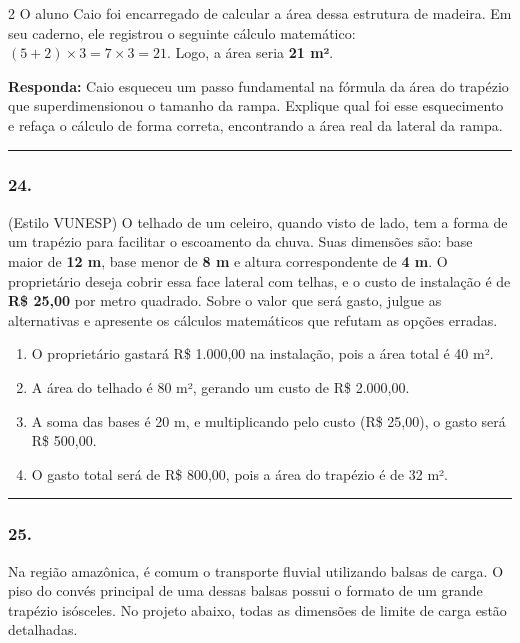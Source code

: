 \documentclass[twoside, 10pt, a4paper]{article}
\newlength{\espacoPreQuestao}\setlength{\espacoPreQuestao}{0.1cm}
\newlength{\espacoQuestao}\setlength{\espacoQuestao}{0.2cm}
\newlength{\espacoAlt}\setlength{\espacoAlt}{0.2cm}
\begin{document}
\begin{multicols*}{2}
O aluno Caio foi encarregado de calcular a área dessa estrutura de madeira. Em seu caderno, ele registrou o seguinte cálculo matemático: $ (5 + 2) \times 3 = 7 \times 3 = 21 $. Logo, a área seria \textbf{21 m²}.

\begin{boxresponda}
\textbf{Responda:} Caio esqueceu um passo fundamental na fórmula da área do trapézio que superdimensionou o tamanho da rampa. Explique qual foi esse esquecimento e refaça o cálculo de forma correta, encontrando a área real da lateral da rampa.
\end{boxresponda}
\par\vspace{\espacoQuestao}

\noindent\textcolor{CorLinha}{\rule{\linewidth}{0.5pt}} 
\par\vspace{\espacoPreQuestao}
\subsubsection*{24.} (Estilo VUNESP) O telhado de um celeiro, quando visto de lado, tem a forma de um trapézio para facilitar o escoamento da chuva. Suas dimensões são: base maior de \textbf{12 m}, base menor de \textbf{8 m} e altura correspondente de \textbf{4 m}. O proprietário deseja cobrir essa face lateral com telhas, e o custo de instalação é de \textbf{R\$ 25,00} por metro quadrado. Sobre o valor que será gasto, julgue as alternativas e apresente os cálculos matemáticos que refutam as opções erradas.
\begin{enumerate}[label=\alph*), itemsep=\espacoAlt]
    \item O proprietário gastará R\$ 1.000,00 na instalação, pois a área total é 40 m².
    \item A área do telhado é 80 m², gerando um custo de R\$ 2.000,00.
    \item A soma das bases é 20 m, e multiplicando pelo custo (R\$ 25,00), o gasto será R\$ 500,00.
    \item O gasto total será de R\$ 800,00, pois a área do trapézio é de 32 m².
\end{enumerate}
\par\vspace{\espacoQuestao}

\noindent\textcolor{CorLinha}{\rule{\linewidth}{0.5pt}} 
\par\vspace{\espacoPreQuestao}
\subsubsection*{25.} Na região amazônica, é comum o transporte fluvial utilizando balsas de carga. O piso do convés principal de uma dessas balsas possui o formato de um grande trapézio isósceles. No projeto abaixo, todas as dimensões de limite de carga estão detalhadas.


\end{multicols*}
\end{document}
